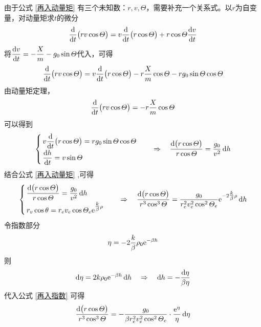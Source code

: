 由于公式 \eqref{再入动量矩} 有三个未知数：$r,v,\varTheta$，需要补充一个关系式。以$r$为自变量，对动量矩求$t$的微分
\begin{equation}
	\dfrac{{\rm{d}} }{{\rm{d}} t} \big(rv \cos \varTheta\big) = v \dfrac{{\rm{d}} }{{\rm{d}} t}\big(r \cos \varTheta\big) + r \cos \varTheta \dfrac{{\rm{d}} v}{{\rm{d}} t}
\end{equation}
将$\dfrac{{\rm{d}} v}{{\rm{d}} t} = - \dfrac{X}{m} - g_0 \sin \varTheta$代入，可得
\begin{equation}
	\dfrac{{\rm{d}} }{{\rm{d}} t}\big(r v \cos \varTheta\big) = v \dfrac{{\rm{d}} }{{\rm{d}} t}\big(r \cos \varTheta\big) - r \dfrac{X}{m}\cos \varTheta - rg_0 \sin \varTheta \cos \varTheta
\end{equation}
由动量矩定理，
\begin{equation*}
		\dfrac{{\rm{d}} }{{\rm{d}} t}\big(r v \cos \varTheta\big) = - r \dfrac{X}{m}\cos \varTheta 
\end{equation*}
可以得到
\begin{equation}
	\begin{cases}
		\, v \dfrac{{\rm{d}} }{{\rm{d}} t}\big(r \cos \varTheta\big) = r g_0 \sin \varTheta \cos \varTheta\\[0.5em]
		\, \dfrac{{\rm{d}} h}{{\rm{d}} t} = v \sin \varTheta
	\end{cases}
	\quad \Rightarrow \quad 
	\dfrac{{\rm{d}} \big(r \cos \varTheta\big)}{r \cos \varTheta} = \dfrac{g_0}{v^2}\, {\rm{d}} h
\end{equation}
结合公式 \eqref{再入动量矩} ,可得
\begin{equation}
	\begin{cases}
		\, \dfrac{{\rm{d}} \big(r \cos \varTheta\big)}{r \cos \varTheta} = \dfrac{g_0}{v^2}\, {\rm{d}} h \\[0.5em]
		\, r_v \cos \theta = r_e v_e \cos \varTheta_e{\rm{e}}^{{\textstyle \frac{k}{\beta}}\rho}
	\end{cases}
	\quad \Rightarrow \quad 
	\dfrac{{\rm{d}} \big(r \cos \varTheta\big)}{r^3 \cos^3 \varTheta} = \dfrac{g_0}{r_e^2v_e^2 \cos^2 \varTheta_e}{\rm{e}}^{-2{\textstyle \frac{k}{\beta}}\rho}\, {\rm{d}} h
	\label{再入指数}
\end{equation}
令指数部分
\begin{equation}
	\eta = - 2 \dfrac{k}{\beta} \rho_0 {\rm{e}}^{-\beta h}
\end{equation}
则
\begin{equation*}
	{\rm{d}} \eta = 2 k \rho_0 {\rm{e}}^{-\beta h}\, {\rm{d}} h \quad \Rightarrow \quad {\rm{d}} h = - \dfrac{{\rm{d}} \eta}{\beta \eta}
\end{equation*}
代入公式 \eqref{再入指数} 可得
\begin{equation*}
	\dfrac{{\rm{d}} \big(r \cos \varTheta\big)}{r^3 \cos^3 \varTheta} = -\dfrac{g_0}{\beta r_e^2v_e^2 \cos^2 \varTheta_e}\cdot \dfrac{{\rm{e}}^\eta}{\eta}\, {\rm{d}} \eta
\end{equation*}
